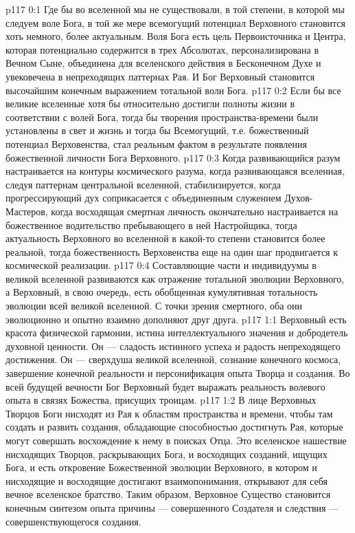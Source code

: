 \author{Могучий Вестник}
\vs p117 0:1 Где бы во вселенной мы не существовали, в той степени, в которой мы следуем воле Бога, в той же мере всемогущий потенциал Верховного становится хоть немного, более актуальным. Воля Бога есть цель Первоисточника и Центра, которая потенциально содержится в трех Абсолютах, персонализирована в Вечном Сыне, объединена для вселенского действия в Бесконечном Духе и увековечена в непреходящих паттернах Рая. И Бог Верховный становится высочайшим конечным выражением тотальной воли Бога.
\vs p117 0:2 Если бы все великие вселенные хотя бы относительно достигли полноты жизни в соответствии с волей Бога, тогда бы творения пространства\hyp{}времени были установлены в свет и жизнь и тогда бы Всемогущий, т.е. божественный потенциал Верховенства, стал реальным фактом в результате появления божественной личности Бога Верховного.
\vs p117 0:3 Когда развивающийся разум настраивается на контуры космического разума, когда развивающаяся вселенная, следуя паттернам центральной вселенной, стабилизируется, когда прогрессирующий дух соприкасается с объединенным служением Духов\hyp{}Мастеров, когда восходящая смертная личность окончательно настраивается на божественное водительство пребывающего в ней Настройщика, тогда актуальность Верховного во вселенной в какой\hyp{}то степени становится более реальной, тогда божественность Верховенства еще на один шаг продвигается к космической реализации.
\vs p117 0:4 Составляющие части и индивидуумы в великой вселенной развиваются как отражение тотальной эволюции Верховного, а Верховный, в свою очередь, есть обобщенная кумулятивная тотальность эволюции всей великой вселенной. С точки зрения смертного, оба они эволюционно и опытно взаимно дополняют друг друга.
\vs p117 1:1 Верховный есть красота физической гармонии, истина интеллектуального значения и добродетель духовной ценности. Он --- сладость истинного успеха и радость непреходящего достижения. Он --- сверхдуша великой вселенной, сознание конечного космоса, завершение конечной реальности и персонификация опыта Творца и создания. Во всей будущей вечности Бог Верховный будет выражать реальность волевого опыта в связях Божества, присущих троицам.
\vs p117 1:2 \pc В лице Верховных Творцов Боги нисходят из Рая к областям пространства и времени, чтобы там создать и развить создания, обладающие способностью достигнуть Рая, которые могут совершать восхождение к нему в поисках Отца. Это вселенское нашествие нисходящих Творцов, раскрывающих Бога, и восходящих созданий, ищущих Бога, и есть откровение Божественной эволюции Верховного, в котором и нисходящие и восходящие достигают взаимопонимания, открывают для себя вечное вселенское братство. Таким образом, Верховное Существо становится конечным синтезом опыта причины --- совершенного Создателя и следствия --- совершенствующегося создания.
